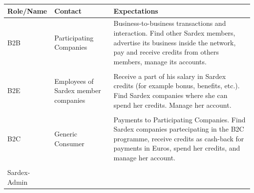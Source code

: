 {\small
\begin{longtable}[]{@{}lll@{}}
\toprule
\begin{minipage}[b]{0.18\columnwidth}\raggedright\strut
Role/Name\strut
\end{minipage} & \begin{minipage}[b]{0.25\columnwidth}\raggedright\strut
Contact\strut
\end{minipage} & \begin{minipage}[b]{0.45\columnwidth}\raggedright\strut
Expectations\strut
\end{minipage}\tabularnewline
\midrule
\endhead
\begin{minipage}[t]{0.18\columnwidth}B2B \end{minipage} &
\begin{minipage}[t]{0.25\columnwidth}Participating Companies \end{minipage} &
\begin{minipage}[t]{0.45\columnwidth}Business-to-business transactions and interaction. Find other Sardex members, advertise its business inside the network, pay and receive credits from others members, manage its accounts.\end{minipage}
\tabularnewline
\tabularnewline
\begin{minipage}[t]{0.18\columnwidth}B2E \end{minipage} &
\begin{minipage}[t]{0.25\columnwidth}Employees of Sardex member companies\end{minipage} &
\begin{minipage}[t]{0.45\columnwidth}Receive a part of his salary in Sardex credits (for example bonus, benefits, etc.). Find Sardex companies where she can spend her credits. Manage her account.\end{minipage}
\tabularnewline
\tabularnewline
\begin{minipage}[t]{0.18\columnwidth}B2C \end{minipage} &
\begin{minipage}[t]{0.25\columnwidth}Generic Consumer \end{minipage} &
\begin{minipage}[t]{0.45\columnwidth}Payments to Participating Companies. Find Sardex companies partecipating in the B2C programme, receive credits as cash-back for payments in Euros, spend her credits, and manage her account.\end{minipage}
\tabularnewline
\tabularnewline
\begin{minipage}[t]{0.18\columnwidth}Sardex-Admin \end{minipage} &

\end{longtable}}
